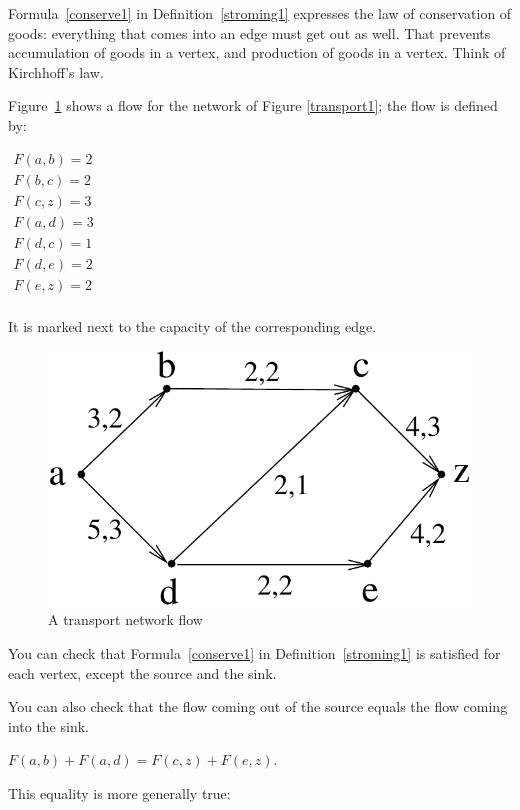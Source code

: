 Formula~\ref{conserve1} in Definition~\ref{stroming1} expresses the
law of conservation of goods: everything that comes into an edge must
get out as well. That prevents accumulation of goods in a vertex, and
production of goods in a vertex. Think of Kirchhoff's law.

Figure~\ref{stroom2} shows a flow for the network of Figure
\ref{transport1}; the flow is defined by:
\begin{center}
$
\begin{array}{l}
F(a,b) = 2\\
F(b,c) = 2\\
F(c,z) = 3\\
F(a,d) = 3\\
F(d,c) = 1\\
F(d,e) = 2\\
F(e,z) = 2\\
\end{array}
$
\end{center}
It is marked next to the capacity of the corresponding edge.
\begin{figure}[ht]
\begin{center}
\includegraphics[width=0.3\linewidth,keepaspectratio]{stroom2} %
\end{center}
\caption{A transport network flow \label{stroom2}}
\end{figure}

You can check that Formula~\ref{conserve1} in
Definition~\ref{stroming1} is satisfied for each vertex, except the
source and the sink.

You can also check that the flow coming out of the source equals the
flow coming into the sink.

\begin{center}
\mbox{$F(a,b)+F(a,d) = F(c,z) + F(e,z)$}.
\end{center}
This equality is more generally true:

